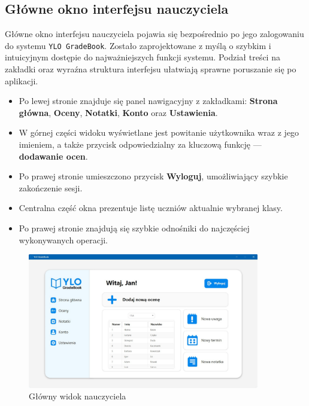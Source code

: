 \subsection{Główne okno interfejsu nauczyciela}
Główne okno interfejsu nauczyciela pojawia się bezpośrednio po jego zalogowaniu do systemu \texttt{YLO GradeBook}. Zostało zaprojektowane z myślą o szybkim i intuicyjnym dostępie do najważniejszych funkcji systemu. Podział treści na zakładki oraz wyraźna struktura interfejsu ułatwiają sprawne poruszanie się po aplikacji.
\begin{itemize}
    \item Po lewej stronie znajduje się panel nawigacyjny z zakładkami: \textbf{Strona główna}, \textbf{Oceny}, \textbf{Notatki}, \textbf{Konto} oraz \textbf{Ustawienia}.
    \item W górnej części widoku wyświetlane jest powitanie użytkownika wraz z jego imieniem, a także przycisk odpowiedzialny za kluczową funkcję — \textbf{dodawanie ocen}.
    \item Po prawej stronie umieszczono przycisk \textbf{Wyloguj}, umożliwiający szybkie zakończenie sesji.
    \item Centralna część okna prezentuje listę uczniów aktualnie wybranej klasy.
    \item Po prawej stronie znajdują się szybkie odnośniki do najczęściej wykonywanych operacji.
\end{itemize}

\begin{figure}[H]
    \centering
    \includegraphics[width=0.9\textwidth]{figures/fig_0008.eps}
    \caption{Główny widok nauczyciela}
    \label{fig:teacherWindow}
\end{figure}
\newpage
